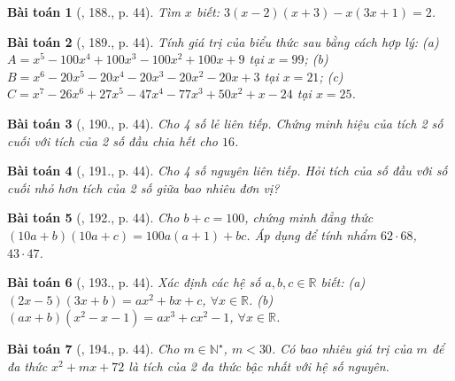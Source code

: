 \documentclass{article}
\newtheorem{baitoan}{Bài toán}
\begin{document}
\begin{baitoan}[\cite{Tuyen_Toan_7}, 188., p. 44]
	Tìm $x$ biết: $3(x - 2)(x + 3) - x(3x + 1) = 2$.
\end{baitoan}

\begin{baitoan}[\cite{Tuyen_Toan_7}, 189., p. 44]
	Tính giá trị của biểu thức sau bằng cách hợp lý: (a) $A = x^5 - 100x^4 + 100x^3 - 100x^2 + 100x + 9$ tại $x = 99$; (b) $B = x^6 - 20x^5 - 20x^4 - 20x^3 - 20x^2 - 20x + 3$ tại $x = 21$; (c) $C = x^7 - 26x^6 + 27x^5 - 47x^4 - 77x^3 + 50x^2 + x - 24$ tại $x = 25$.
\end{baitoan}

\begin{baitoan}[\cite{Tuyen_Toan_7}, 190., p. 44]
	Cho 4 số lẻ liên tiếp. Chứng minh hiệu của tích 2 số cuối với tích của 2 số đầu chia hết cho $16$.
\end{baitoan}

\begin{baitoan}[\cite{Tuyen_Toan_7}, 191., p. 44]
	Cho 4 số nguyên liên tiếp. Hỏi tích của số đầu với số cuối nhỏ hơn tích của 2 số giữa bao nhiêu đơn vị?
\end{baitoan}

\begin{baitoan}[\cite{Tuyen_Toan_7}, 192., p. 44]
	Cho $b + c = 100$, chứng minh đẳng thức $(10a + b)(10a + c) = 100a(a + 1) + bc$. Áp dụng để tính nhẩm $62\cdot68$, $43\cdot47$.
\end{baitoan}

\begin{baitoan}[\cite{Tuyen_Toan_7}, 193., p. 44]
	Xác định các hệ số $a,b,c\in\mathbb{R}$ biết: (a) $(2x - 5)(3x + b) = ax^2 + bx + c$, $\forall x\in\mathbb{R}$. (b) $(ax + b)(x^2 - x - 1) = ax^3 + cx^2 - 1$, $\forall x\in\mathbb{R}$.
\end{baitoan}

\begin{baitoan}[\cite{Tuyen_Toan_7}, 194., p. 44]
	Cho $m\in\mathbb{N}^\star$, $m < 30$. Có bao nhiêu giá trị của $m$ để đa thức $x^2 + mx + 72$ là tích của 2 đa thức bậc nhất với hệ số nguyên.
\end{baitoan}

\end{document}
